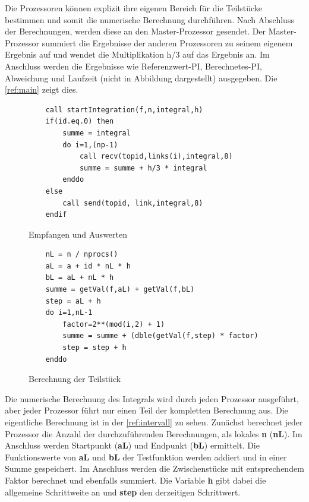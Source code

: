 Die Prozessoren können explizit ihre eigenen Bereich für die Teilstücke bestimmen und somit die numerische Berechnung durchführen.
Nach Abschluss der Berechnungen, werden diese an den Master-Prozessor gesendet.
Der Master-Prozessor summiert die Ergebnisse der anderen Prozessoren zu seinem eigenem Ergebnis auf und wendet die Multiplikation h/3 auf das Ergebnis an.
Im Anschluss werden die Ergebnisse wie Referenzwert-PI, Berechnetes-PI, Abweichung und Laufzeit (nicht in Abbildung dargestellt) ausgegeben. 
Die \autoref{ref:main} zeigt dies.
\begin{figure}[h]
\hrulefill

\begin{minipage}{0.49\textwidth}
\begin{lstlisting}
	call startIntegration(f,n,integral,h)
	if(id.eq.0) then
		summe = integral
		do i=1,(np-1)
			call recv(topid,links(i),integral,8)
			summe = summe + h/3 * integral
		enddo
	else
		call send(topid, link,integral,8)
	endif
\end{lstlisting}
	\caption{Empfangen und Auswerten}
	\label{ref:main}
\end{minipage}
\hfill
\vline
\begin{minipage}{0.49\textwidth}
\begin{lstlisting}
	nL = n / nprocs()
	aL = a + id * nL * h
	bL = aL + nL * h
	summe = getVal(f,aL) + getVal(f,bL)   
	step = aL + h
	do i=1,nL-1
		factor=2**(mod(i,2) + 1)
		summe = summe + (dble(getVal(f,step) * factor)
		step = step + h    
	enddo
\end{lstlisting}
	\caption{Berechnung der Teilstück}
	\label{ref:intervall}
\end{minipage}

\hrulefill
\end{figure}

Die numerische Berechnung des Integrals wird durch jeden Prozessor ausgeführt, aber jeder Prozessor führt nur einen Teil der kompletten Berechnung aus.
Die eigentliche Berechnung ist in der \autoref{ref:intervall} zu sehen.
Zunächst berechnet jeder Prozessor die Anzahl der durchzuführenden Berechnungen, als lokales \textbf{n} (\textbf{nL}).
Im Anschluss werden Startpunkt (\textbf{aL}) und Endpunkt (\textbf{bL}) ermittelt.
Die Funktionswerte von \textbf{aL} und \textbf{bL} der Testfunktion werden addiert und in einer Summe gespeichert.
Im Anschluss werden die Zwischenstücke mit entsprechendem Faktor berechnet und ebenfalls summiert.
Die Variable \textbf{h} gibt dabei die allgemeine Schrittweite an und \textbf{step} den derzeitigen Schrittwert.

